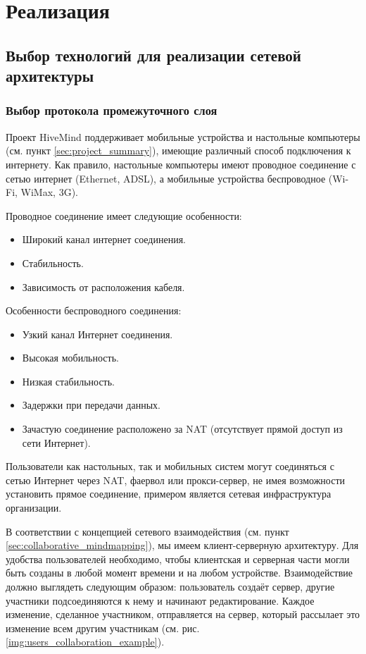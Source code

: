 \newpage

\chapter{Реализация}
\label{ch:chapter_2}

\section{Выбор технологий для реализации сетевой архитектуры}

\subsection{Выбор протокола промежуточного слоя}
\label{sec:choosing_middleware}
Проект HiveMind поддерживает мобильные устройства и настольные компьютеры (см.
пункт \ref{sec:project_summary}), имеющие различный способ подключения к
интернету. Как правило, настольные компьютеры имеют проводное соединение с сетью
интернет (Ethernet, ADSL), а мобильные устройства беспроводное (Wi-Fi, WiMax,
3G).

Проводное соединение имеет следующие особенности:
\begin{itemize}
\item Широкий канал интернет соединения.
\item Стабильность.
\item Зависимость от расположения кабеля.
\end{itemize}

Особенности беспроводного соединения:
\begin{itemize}
\item Узкий канал Интернет соединения.
\item Высокая мобильность.
\item Низкая стабильность.
\item Задержки при передачи данных.
\item Зачастую соединение расположено за NAT (отсутствует прямой доступ из сети
Интернет).
\end{itemize}

Пользователи как настольных, так и мобильных систем могут соединяться с сетью
Интернет через NAT, фаервол или прокси-сервер, не имея возможности установить
прямое соединение, примером является сетевая инфраструктура организации.

В соответствии с концепцией сетевого взаимодействия (см. пункт
\ref{sec:collaborative_mindmapping}), мы имеем клиент-серверную архитектуру. Для
удобства пользователей необходимо, чтобы клиентская и серверная части могли быть
созданы в любой момент времени и на любом устройстве. Взаимодействие должно
выглядеть следующим образом: пользователь создаёт сервер, другие участники
подсоединяются к нему и начинают редактирование. Каждое изменение, сделанное
участником, отправляется на сервер, который рассылает это изменение всем другим
участникам (см. рис. \ref{img:users_collaboration_example}).

